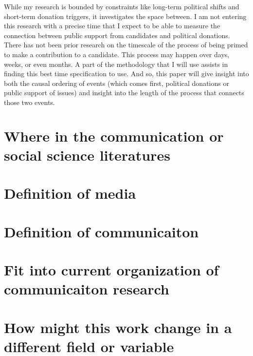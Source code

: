 \documentclass[12pt,]{article}
\begin{document}
While my research is bounded by constraints like long-term political
shifts and short-term donation triggers, it investigates the space
between. I am not entering this research with a precise time that I
expect to be able to measure the connection between public support from
candidates and political donations. There has not been prior research on
the timescale of the process of being primed to make a contribution to a
candidate. This process may happen over days, weeks, or even months. A
part of the methodology that I will use assists in finding this best
time specification to use. And so, this paper will give insight into
both the causal ordering of events (which comes first, political
donations or public support of issues) and insight into the length of
the process that connects those two events.

\hypertarget{where-in-the-communication-or-social-science-literatures}{%
\section{Where in the communication or social science
literatures}\label{where-in-the-communication-or-social-science-literatures}}

\hypertarget{definition-of-media}{%
\section{Definition of media}\label{definition-of-media}}

\hypertarget{definition-of-communicaiton}{%
\section{Definition of
communicaiton}\label{definition-of-communicaiton}}

\hypertarget{fit-into-current-organization-of-communicaiton-research}{%
\section{Fit into current organization of communicaiton
research}\label{fit-into-current-organization-of-communicaiton-research}}

\hypertarget{how-might-this-work-change-in-a-different-field-or-variable}{%
\section{How might this work change in a different field or
variable}\label{how-might-this-work-change-in-a-different-field-or-variable}}





\newpage
\singlespacing 
\end{document}

